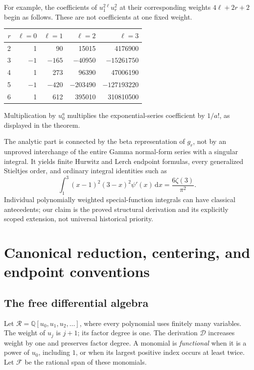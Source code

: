 \documentclass[11pt,letterpaper]{article}
\numberwithin{equation}{section}
\theoremstyle{definition}\newtheorem{definition}[theorem]{Definition}
\theoremstyle{remark}\newtheorem{remark}[theorem]{Remark}
\newcommand{\Q}{\mathbb Q}\newcommand{\C}{\mathbb C}\newcommand{\N}{\mathbb N}
\newcommand{\D}{\mathcal D}\newcommand{\NF}{\mathcal N}\newcommand{\Prim}{\mathcal T}
\newcommand{\dd}{\,\mathrm d}\newcommand{\ii}{\mathrm i}
\begin{document}
For example, the coefficients of $u_1^{2\ell}u_r^2$ at their corresponding
weights $4\ell+2r+2$ begin as follows. These are not coefficients at
one fixed weight.
\begin{center}
\begin{tabular}{@{}rrrrr@{}}
\toprule
$r$ & $\ell=0$ & $\ell=1$ & $\ell=2$ & $\ell=3$\\
\midrule
2&1&90&15015&4176900\\
3&$-1$&$-165$&$-40950$&$-15261750$\\
4&1&273&96390&47006190\\
5&$-1$&$-420$&$-203490$&$-127193220$\\
6&1&612&395010&310810500\\
\bottomrule
\end{tabular}
\end{center}
Multiplication by $u_0^a$ multiplies the exponential-series coefficient
by $1/a!$, as displayed in the theorem.

The analytic part is connected by the beta representation of $g_r$,
not by an unproved interchange of the entire Gamma normal-form series
with a singular integral. It yields finite Hurwitz and Lerch endpoint
formulas, every generalized Stieltjes order, and ordinary integral
identities such as
\begin{equation}\label{ag:eq:trigamma-preview}
 \int_1^3(x-1)^2(3-x)^2\psi'(x)\dd x=\frac{6\zeta(3)}{\pi^2}.
\end{equation}
Individual polynomially weighted special-function integrals can have
classical antecedents; our claim is the proved structural derivation
and its explicitly scoped extension, not universal historical priority.



\section{Canonical reduction, centering, and endpoint conventions}
\label{ag:sec:normal}

\subsection{The free differential algebra}
Let $\mathscr R=\Q[u_0,u_1,u_2,\ldots]$, where every polynomial uses
finitely many variables. The weight of $u_j$ is $j+1$; its factor degree
is one. The derivation $\D$ increases weight by one and preserves factor
degree. A monomial is \emph{functional} when it is a power of $u_0$,
including $1$, or when its largest positive index occurs at least twice.
Let $\mathscr F$ be the rational span of these monomials.
\end{document}
